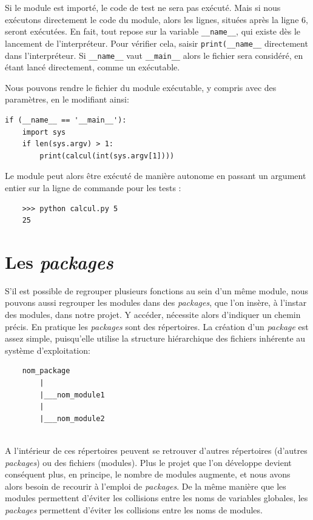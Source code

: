 \documentclass[a4paper,12pt]{book}
\begin{document}
Si le module est importé, le code de test ne sera pas exécuté. Mais si nous exécutons directement le code du module, alors les lignes, situées après la ligne 6, seront exécutées. En fait, tout repose sur la variable \texttt{\_\_name\_\_}, qui existe dès le lancement de l'interpréteur. Pour vérifier cela, saisir \texttt{print(\_\_name\_\_} directement dans l'interpréteur. Si \texttt{\_\_name\_\_} vaut \texttt{\_\_main\_\_} alors le fichier sera considéré, en étant lancé directement, comme un exécutable.
\medskip

Nous pouvons rendre le fichier du module exécutable, y compris avec des paramètres, en le modifiant ainsi:
\begin{lstlisting}[caption=Module \texttt{calcul.py} exécutable]
if (__name__ == '__main__'):
    import sys
    if len(sys.argv) > 1:
        print(calcul(int(sys.argv[1])))
\end{lstlisting}
\medskip

Le module peut alors être exécuté de manière autonome en passant un argument entier sur la ligne de commande pour les tests :
\begin{verbatim}
    >>> python calcul.py 5
    25
\end{verbatim}
\medskip

\section{Les \textit{packages}}
S'il est possible de regrouper plusieurs fonctions au sein d'un même module, nous pouvons aussi regrouper les modules dans des \textit{packages}, que l'on insère, à l'instar des modules, dans notre projet. Y accéder, nécessite alors d'indiquer un chemin précis. En pratique les \textit{packages} sont des répertoires. La création d'un \textit{package} est assez simple, puisqu'elle utilise la structure hiérarchique des fichiers inhérente au système d'exploitation:
\begin{verbatim}
    nom_package
        |
        |___nom_module1
        |
        |___nom_module2
        
\end{verbatim}
\medskip

A l'intérieur de ces répertoires peuvent se retrouver d'autres répertoires (d'autres \textit{packages}) ou des fichiers (modules). Plus le projet que l'on développe devient conséquent plus, en principe, le nombre de modules augmente, et nous avons alors besoin de recourir à l'emploi de \textit{packages}. De la même manière que les modules permettent d'éviter les collisions entre les noms de variables globales, les \textit{packages} permettent d'éviter les collisions entre les noms de modules.
\medskip
\end{document}
